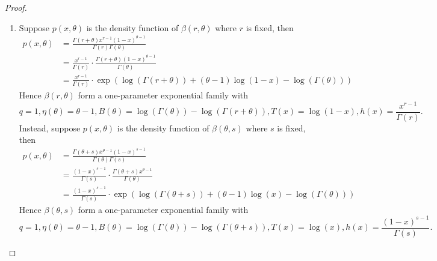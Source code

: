 \documentclass{amsbook}
\theoremstyle{definition}
\theoremstyle{remark}
\numberwithin{section}{chapter}
\numberwithin{equation}{chapter}
\begin{document}
\begin{proof}
\begin{enumerate}
\[\]Instead, suppose $p(x,\theta)$ is the density function of $\Gamma(\theta,\lambda)$ where $\lambda$ is fixed, then\[
\begin{split}
p(x,\theta)&=\frac{\lambda^\theta x^{\theta-1}}{\Gamma(p)}\\
&=\frac{e^{-\lambda x}}{\Gamma(p)}\exp(\log(\lambda^\theta)+(\theta-1)\log(x))\\
\end{split}
\]Hence $\Gamma(\theta,\lambda)$ form a one-parameter exponential family with\[
q=1,\eta(\theta)=\theta-1,B(\theta)=-\log(\lambda^\theta),T(x)=\log(x),h(x)=\frac{e^{-\lambda x}}{\Gamma(p)}.
\]
\item Suppose $p(x,\theta)$ is the density function of $\beta(r,\theta)$ where $r$ is fixed, then\[
\begin{split}
p(x,\theta)&=\frac{\Gamma(r+\theta)x^{r-1}(1-x)^{\theta-1}}{\Gamma(r)\Gamma(\theta)}\\
&=\frac{x^{r-1}}{\Gamma(r)}\cdot\frac{\Gamma(r+\theta)(1-x)^{\theta-1}}{\Gamma(\theta)}\\
&=\frac{x^{r-1}}{\Gamma(r)}\cdot\exp(\log(\Gamma(r+\theta))+(\theta-1)\log(1-x)-\log(\Gamma(\theta)))
\end{split}
\]Hence $\beta(r,\theta)$ form a one-parameter exponential family with\[
q=1,\eta(\theta)=\theta-1,B(\theta)=\log(\Gamma(\theta))-\log(\Gamma(r+\theta)),T(x)=\log(1-x),h(x)=\frac{x^{r-1}}{\Gamma(r)}.
\]Instead, suppose $p(x,\theta)$ is the density function of $\beta(\theta,s)$ where $s$ is fixed, then\[
\begin{split}
p(x,\theta)&=\frac{\Gamma({\theta+s})x^{\theta-1}(1-x)^{s-1}}{\Gamma(\theta)\Gamma(s)}\\
&=\frac{(1-x)^{s-1}}{\Gamma(s)}\cdot\frac{\Gamma({\theta+s})x^{\theta-1}}{\Gamma(\theta)}\\
&=\frac{(1-x)^{s-1}}{\Gamma(s)}\cdot\exp(\log(\Gamma(\theta+s))+(\theta-1)\log(x)-\log(\Gamma(\theta)))
\end{split}
\]Hence $\beta(\theta,s)$ form a one-parameter exponential family with\[
q=1,\eta(\theta)=\theta-1,B(\theta)=\log(\Gamma(\theta))-\log(\Gamma(\theta+s)),T(x)=\log(x),h(x)=\frac{(1-x)^{s-1}}{\Gamma(s)}.
\]
\end{enumerate}
\end{proof}

\backmatter


\end{document}
